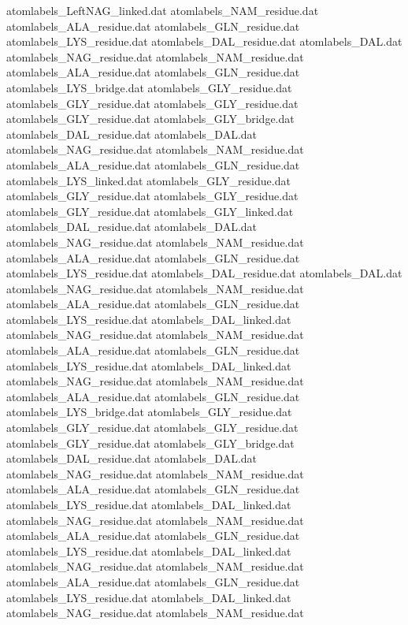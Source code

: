 atomlabels_LeftNAG_linked.dat   
atomlabels_NAM_residue.dat      
atomlabels_ALA_residue.dat      
atomlabels_GLN_residue.dat      
atomlabels_LYS_residue.dat      
atomlabels_DAL_residue.dat      
atomlabels_DAL.dat              
atomlabels_NAG_residue.dat      
atomlabels_NAM_residue.dat      
atomlabels_ALA_residue.dat      
atomlabels_GLN_residue.dat      
atomlabels_LYS_bridge.dat       
atomlabels_GLY_residue.dat
atomlabels_GLY_residue.dat
atomlabels_GLY_residue.dat
atomlabels_GLY_residue.dat
atomlabels_GLY_bridge.dat
atomlabels_DAL_residue.dat      
atomlabels_DAL.dat              
atomlabels_NAG_residue.dat      
atomlabels_NAM_residue.dat      
atomlabels_ALA_residue.dat      
atomlabels_GLN_residue.dat      
atomlabels_LYS_linked.dat       
atomlabels_GLY_residue.dat
atomlabels_GLY_residue.dat
atomlabels_GLY_residue.dat
atomlabels_GLY_residue.dat
atomlabels_GLY_linked.dat
atomlabels_DAL_residue.dat      
atomlabels_DAL.dat              
atomlabels_NAG_residue.dat      
atomlabels_NAM_residue.dat      
atomlabels_ALA_residue.dat      
atomlabels_GLN_residue.dat      
atomlabels_LYS_residue.dat      
atomlabels_DAL_residue.dat      
atomlabels_DAL.dat              
atomlabels_NAG_residue.dat      
atomlabels_NAM_residue.dat      
atomlabels_ALA_residue.dat      
atomlabels_GLN_residue.dat      
atomlabels_LYS_residue.dat      
atomlabels_DAL_linked.dat       
atomlabels_NAG_residue.dat      
atomlabels_NAM_residue.dat      
atomlabels_ALA_residue.dat      
atomlabels_GLN_residue.dat      
atomlabels_LYS_residue.dat      
atomlabels_DAL_linked.dat       
atomlabels_NAG_residue.dat      
atomlabels_NAM_residue.dat      
atomlabels_ALA_residue.dat      
atomlabels_GLN_residue.dat      
atomlabels_LYS_bridge.dat       
atomlabels_GLY_residue.dat
atomlabels_GLY_residue.dat
atomlabels_GLY_residue.dat
atomlabels_GLY_residue.dat
atomlabels_GLY_bridge.dat
atomlabels_DAL_residue.dat      
atomlabels_DAL.dat              
atomlabels_NAG_residue.dat      
atomlabels_NAM_residue.dat      
atomlabels_ALA_residue.dat      
atomlabels_GLN_residue.dat      
atomlabels_LYS_residue.dat      
atomlabels_DAL_linked.dat       
atomlabels_NAG_residue.dat      
atomlabels_NAM_residue.dat      
atomlabels_ALA_residue.dat      
atomlabels_GLN_residue.dat      
atomlabels_LYS_residue.dat      
atomlabels_DAL_linked.dat       
atomlabels_NAG_residue.dat      
atomlabels_NAM_residue.dat      
atomlabels_ALA_residue.dat      
atomlabels_GLN_residue.dat      
atomlabels_LYS_residue.dat      
atomlabels_DAL_linked.dat       
atomlabels_NAG_residue.dat      
atomlabels_NAM_residue.dat      
